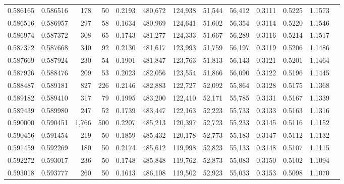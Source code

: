 \begin{tabular}{rrrrrrrrrrrrr}
0.586165 & 0.586516 &   178 &  50 &                                     0.2193 & 480,672 & 124,938 &  51,544 &  56,412 & 0.3111 & 0.5225 & 1.1573 \\
0.586516 & 0.586957 &   297 &  58 &                                     0.1634 & 480,969 & 124,641 &  51,602 &  56,354 & 0.3114 & 0.5220 & 1.1546 \\
0.586974 & 0.587372 &   308 &  65 &                                     0.1743 & 481,277 & 124,333 &  51,667 &  56,289 & 0.3116 & 0.5214 & 1.1517 \\
0.587372 & 0.587668 &   340 &  92 &                                     0.2130 & 481,617 & 123,993 &  51,759 &  56,197 & 0.3119 & 0.5206 & 1.1486 \\
0.587669 & 0.587924 &   230 &  54 &                                     0.1901 & 481,847 & 123,763 &  51,813 &  56,143 & 0.3121 & 0.5201 & 1.1464 \\
0.587926 & 0.588476 &   209 &  53 &                                     0.2023 & 482,056 & 123,554 &  51,866 &  56,090 & 0.3122 & 0.5196 & 1.1445 \\
0.588487 & 0.589181 &   827 & 226 &                                     0.2146 & 482,883 & 122,727 &  52,092 &  55,864 & 0.3128 & 0.5175 & 1.1368 \\
0.589182 & 0.589410 &   317 &  79 &                                     0.1995 & 483,200 & 122,410 &  52,171 &  55,785 & 0.3131 & 0.5167 & 1.1339 \\
0.589439 & 0.589980 &   247 &  52 &                                     0.1739 & 483,447 & 122,163 &  52,223 &  55,733 & 0.3133 & 0.5163 & 1.1316 \\
0.590000 & 0.590451 & 1,766 & 500 &                                     0.2207 & 485,213 & 120,397 &  52,723 &  55,233 & 0.3145 & 0.5116 & 1.1152 \\
0.590456 & 0.591454 &   219 &  50 &                                     0.1859 & 485,432 & 120,178 &  52,773 &  55,183 & 0.3147 & 0.5112 & 1.1132 \\
0.591459 & 0.592269 &   180 &  50 &                                     0.2174 & 485,612 & 119,998 &  52,823 &  55,133 & 0.3148 & 0.5107 & 1.1115 \\
0.592272 & 0.593017 &   236 &  50 &                                     0.1748 & 485,848 & 119,762 &  52,873 &  55,083 & 0.3150 & 0.5102 & 1.1094 \\
0.593018 & 0.593777 &   260 &  50 &                                     0.1613 & 486,108 & 119,502 &  52,923 &  55,033 & 0.3153 & 0.5098 & 1.1070 \\

\end{tabular}
